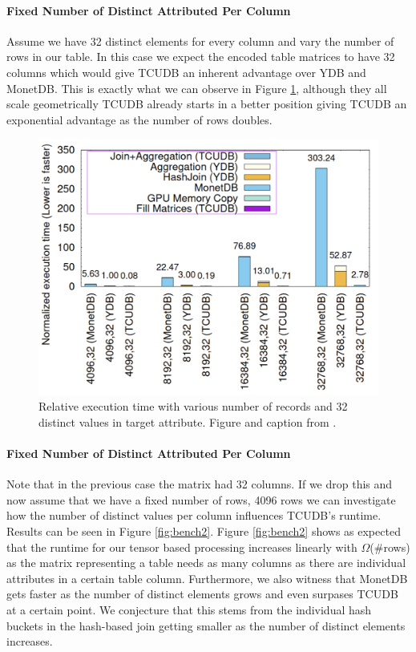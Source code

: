\documentclass{paper}
\begin{document}
\paragraph{Fixed Number of Distinct Attributed Per Column}
Assume we have 32 distinct elements for every column and vary the number of rows in our table.
	In this case we expect the encoded table matrices to have 32 columns which would give TCUDB an inherent advantage over YDB and MonetDB. This is exactly what we can observe in Figure \ref{fig:bench1}, although they all scale geometrically TCUDB already starts in a better position giving TCUDB an exponential advantage as the number of rows doubles. 
	\begin{figure}
		\centering
		\includegraphics[width=0.9\linewidth]{bench1}
		\caption{Relative execution time with various number of records and 32 distinct values in target attribute. Figure and caption from \cite{hu2021tcudb}.}
		\label{fig:bench1}
	\end{figure}
	
\paragraph{Fixed Number of Distinct Attributed Per Column}
Note that in the previous case the matrix had 32 columns. If we drop this and now assume that we have a fixed number of rows, 4096 rows we can investigate how the number of distinct values per column influences TCUDB's runtime. Results can be seen in Figure \ref{fig:bench2}. Figure \ref{fig:bench2} shows as expected that the runtime for our tensor based processing increases linearly with $\Omega$(\#rows) as the matrix representing a table needs as many columns as there are individual attributes in a certain table column. Furthermore, we also witness that MonetDB gets faster as the number of distinct elements grows and even surpases TCUDB at a certain point. We conjecture that this stems from the individual hash buckets in the hash-based join getting smaller as the number of distinct elements increases.
\end{document}
